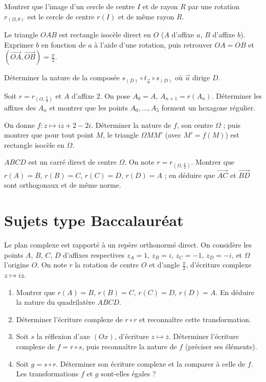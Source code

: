 \exo{} Montrer que l'image d'un cercle de centre $I$ et de rayon $R$ par une rotation $r_{(\Omega,\theta)}$ est le cercle de centre $r(I)$ et de même rayon $R$.

\exo{} Le triangle $OAB$ est rectangle isocèle direct en $O$ ($A$ d'affixe $a$, $B$ d'affixe $b$). Exprimer $b$ en fonction de $a$ à l'aide d'une rotation, puis retrouver $OA=OB$ et $(\overrightarrow{OA},\overrightarrow{OB})=\frac\pi2$.

\exo{} Déterminer la nature de la composée $s_{(D)}\circ t_{\vec u}\circ s_{(D)}$ où $\vec u$ dirige $D$.

\exo{} Soit $r=r_{(O,\frac\pi3)}$ et $A$ d'affixe $2$. On pose $A_0=A$, $A_{n+1}=r(A_n)$. Déterminer les affixes des $A_n$ et montrer que les points $A_0,\dots,A_5$ forment un hexagone régulier.

\exo{} On donne $f:z\mapsto iz+2-2i$. Déterminer la nature de $f$, son centre $\Omega$ ; puis montrer que pour tout point $M$, le triangle $\Omega M M'$ (avec $M'=f(M)$) est rectangle isocèle en $\Omega$.

\exo{} $ABCD$ est un carré direct de centre $\Omega$. On note $r=r_{(\Omega,\frac\pi2)}$. Montrer que $r(A)=B$, $r(B)=C$, $r(C)=D$, $r(D)=A$ ; en déduire que $\overrightarrow{AC}$ et $\overrightarrow{BD}$ sont orthogonaux et de même norme.

\section{Sujets type Baccalauréat}

Le plan complexe est rapporté à un repère orthonormé direct. On considère les points $A$, $B$, $C$, $D$ d'affixes respectives $z_A=1$, $z_B=i$, $z_C=-1$, $z_D=-i$, et $\Omega$ l'origine $O$.
On note $r$ la rotation de centre $O$ et d'angle $\frac\pi2$, d'écriture complexe $z\mapsto iz$.
\begin{enumerate}[label=\arabic*)]
\item Montrer que $r(A)=B$, $r(B)=C$, $r(C)=D$, $r(D)=A$. En déduire la nature du quadrilatère $ABCD$.
\item Déterminer l'écriture complexe de $r\circ r$ et reconnaître cette transformation.
\item Soit $s$ la réflexion d'axe $(Ox)$, d'écriture $z\mapsto\overline z$. Déterminer l'écriture complexe de $f=r\circ s$, puis reconnaître la nature de $f$ (préciser ses éléments).
\item Soit $g=s\circ r$. Déterminer son écriture complexe et la comparer à celle de $f$. Les transformations $f$ et $g$ sont-elles égales ?
\end{enumerate}

